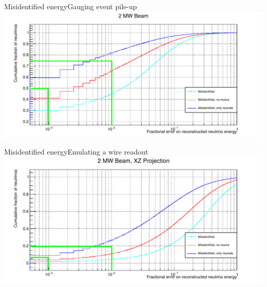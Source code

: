 \documentclass[]{beamer}
\newcommand*{\emphcoltitle}{blue}
\begin{document}
\begin{frame}{Misidentified energy}{\color{\emphcoltitle}Gauging event pile-up}
	\centering
	\includegraphics[width=\textwidth]{defence/misid_rel_y}
\end{frame}

\begin{frame}{Misidentified energy}{\color{\emphcoltitle}Emulating a wire readout}
	\centering
	\includegraphics[width=\textwidth]{defence/misid_rel_y_XZ}
\end{frame}
\end{document}
